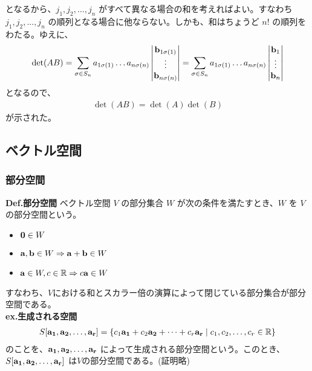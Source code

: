 \documentclass[a4paper,11pt]{jsarticle}
\numberwithin{equation}{section}
\begin{document}
となるから、$j_1, j_2, \dots, j_n$ がすべて異なる場合の和を考えればよい。すなわち $j_1, j_2, \dots, j_n$ の順列となる場合に他ならない。しかも、和はちょうど $n!$ の順列をわたる。ゆえに、
\begin{align}
  \det(AB) = \sum_{\sigma \in S_n} a_{1\sigma(1)} \dots a_{n\sigma(n)} 
  \begin{vmatrix}
      \vb{b}_{1\sigma(1)} \\
      \vdots \\
      \vb{b}_{n\sigma(n)}
  \end{vmatrix}
  = \sum_{\sigma \in S_n} a_{1\sigma(1)} \dots a_{n\sigma(n)} 
  \begin{vmatrix}
      \vb{b}_{1} \\
      \vdots \\
      \vb{b}_{n}
  \end{vmatrix}
\end{align}
となるので、
\begin{align}
  \det(AB) = \det(A) \det(B)
\end{align}
が示された。\hfill\qedsymbol\\

\subsection{ベクトル空間}
\subsubsection{部分空間}
\begin{itembox}[l]{\textbf{Def.部分空間}}
  ベクトル空間 $V$ の部分集合 $W$ が次の条件を満たすとき、$W$ を $V$ の部分空間という。
  \begin{itemize}
    \item $\vb{0} \in W$
    \item $\vb{a}, \vb{b} \in W \Rightarrow \vb{a} + \vb{b} \in W$
    \item $\vb{a} \in W, c \in \mathbb{R} \Rightarrow c\vb{a} \in W$
  \end{itemize}
\end{itembox}
すなわち、$V$における和とスカラー倍の演算によって閉じている部分集合が部分空間である。\\

\textbf{ex.生成される空間}\\
\begin{align}
  S[\vb{a_1}, \vb{a_2}, \dots, \vb{a_r}] = \left\{ c_1\vb{a_1} + c_2\vb{a_2} + \dots + c_r\vb{a_r} \mid c_1, c_2, \dots, c_r \in \mathbb{R} \right\}
\end{align}
のことを、$\vb{a_1}, \vb{a_2}, \dots, \vb{a_r}$ によって生成される部分空間という。このとき、$S[\vb{a_1}, \vb{a_2}, \dots, \vb{a_r}]$ は$V$の部分空間である。(証明略)\\
\end{document}
